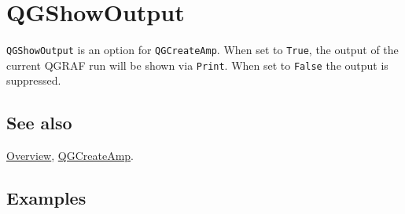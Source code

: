 \documentclass[../FeynHelpersManual.tex]{subfiles}
\begin{document}
\hypertarget{qgshowoutput}{
\section{QGShowOutput}\label{qgshowoutput}}

\texttt{QGShowOutput} is an option for \texttt{QGCreateAmp}. When set to
\texttt{True}, the output of the current QGRAF run will be shown via
\texttt{Print}. When set to \texttt{False} the output is suppressed.

\subsection{See also}

\hyperlink{toc}{Overview}, \hyperlink{qgcreateamp}{QGCreateAmp}.

\subsection{Examples}
\end{document}
